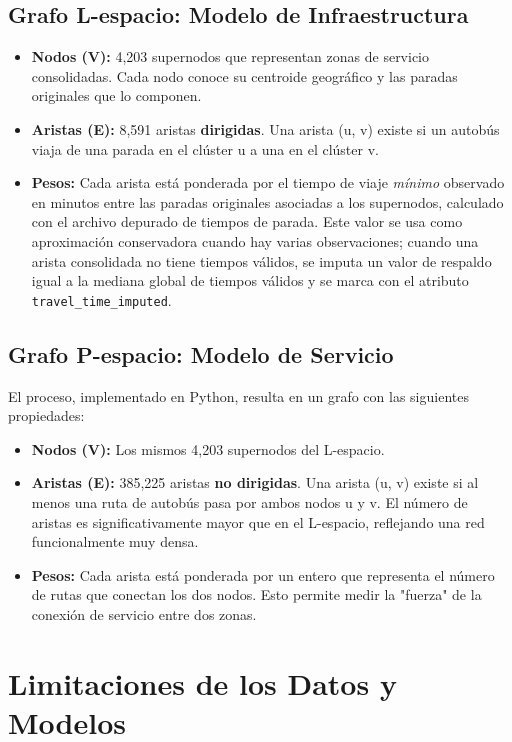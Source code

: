         \subsection{Grafo L-espacio: Modelo de Infraestructura}
            \begin{itemize}
                \item \textbf{Nodos (V):} 4,203 supernodos que representan zonas de servicio consolidadas. Cada nodo conoce su centroide geográfico y las paradas originales que lo componen.
                \item \textbf{Aristas (E):} 8,591 aristas \textbf{dirigidas}. Una arista (u, v) existe si un autobús viaja de una parada en el clúster u a una en el clúster v.
                \item \textbf{Pesos:} Cada arista está ponderada por el tiempo de viaje \emph{mínimo} observado en minutos entre las paradas originales asociadas a los supernodos, calculado con el archivo depurado de tiempos de parada. Este valor se usa como aproximación conservadora cuando hay varias observaciones; cuando una arista consolidada no tiene tiempos válidos, se imputa un valor de respaldo igual a la mediana global de tiempos válidos y se marca con el atributo \texttt{travel\_time\_imputed}.
            \end{itemize}

        \subsection{Grafo P-espacio: Modelo de Servicio}
            El proceso, implementado en Python, resulta en un grafo con las siguientes propiedades:
            \begin{itemize}
                \item \textbf{Nodos (V):} Los mismos 4,203 supernodos del L-espacio.
                \item \textbf{Aristas (E):} 385,225 aristas \textbf{no dirigidas}. Una arista (u, v) existe si al menos una ruta de autobús pasa por ambos nodos u y v. El número de aristas es significativamente mayor que en el L-espacio, reflejando una red funcionalmente muy densa.
                \item \textbf{Pesos:} Cada arista está ponderada por un entero que representa el número de rutas que conectan los dos nodos. Esto permite medir la "fuerza" de la conexión de servicio entre dos zonas.
            \end{itemize}
        
    \section{Limitaciones de los Datos y Modelos}
    
